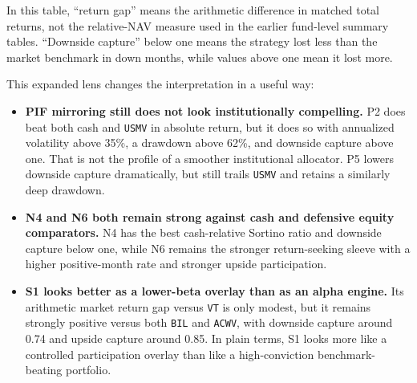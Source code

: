 \documentclass[conference]{IEEEtran}
\begin{document}
\begin{table}[!t]
\caption{Expanded Benchmark and Consistency Readout}
\label{tab:institutional-benchmarks}
\centering
\footnotesize
\renewcommand{\arraystretch}{1.08}
\setlength{\tabcolsep}{3pt}
\end{table}

In this table, ``return gap'' means the arithmetic difference in matched total returns, not the relative-NAV measure used in the earlier fund-level summary tables. ``Downside capture'' below one means the strategy lost less than the market benchmark in down months, while values above one mean it lost more.

This expanded lens changes the interpretation in a useful way:
\begin{itemize}[leftmargin=1.4em]
    \item \textbf{PIF mirroring still does not look institutionally compelling.} P2 does beat both cash and \texttt{USMV} in absolute return, but it does so with annualized volatility above 35\%, a drawdown above 62\%, and downside capture above one. That is not the profile of a smoother institutional allocator. P5 lowers downside capture dramatically, but still trails \texttt{USMV} and retains a similarly deep drawdown.
    \item \textbf{N4 and N6 both remain strong against cash and defensive equity comparators.} N4 has the best cash-relative Sortino ratio and downside capture below one, while N6 remains the stronger return-seeking sleeve with a higher positive-month rate and stronger upside participation.
    \item \textbf{S1 looks better as a lower-beta overlay than as an alpha engine.} Its arithmetic market return gap versus \texttt{VT} is only modest, but it remains strongly positive versus both \texttt{BIL} and \texttt{ACWV}, with downside capture around 0.74 and upside capture around 0.85. In plain terms, S1 looks more like a controlled participation overlay than like a high-conviction benchmark-beating portfolio.
\end{itemize}
\end{document}
